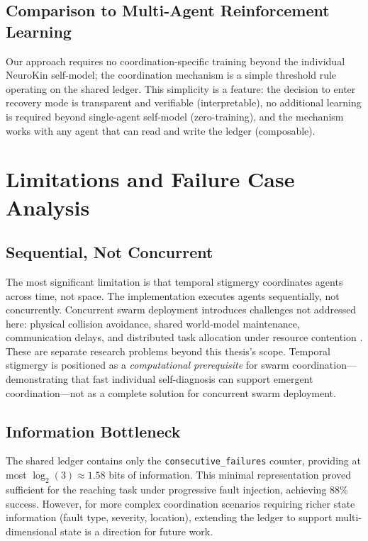 \documentclass[12pt,a4paper,oneside]{report}
\begin{document}
\subsection{Comparison to Multi-Agent Reinforcement Learning}

Our approach requires no coordination-specific training beyond the individual NeuroKin self-model; the coordination mechanism is a simple threshold rule operating on the shared ledger. This simplicity is a feature: the decision to enter recovery mode is transparent and verifiable (interpretable), no additional learning is required beyond single-agent self-model (zero-training), and the mechanism works with any agent that can read and write the ledger (composable).

\section{Limitations and Failure Case Analysis}

\subsection{Sequential, Not Concurrent}

The most significant limitation is that temporal stigmergy coordinates agents across time, not space. The implementation executes agents sequentially, not concurrently. Concurrent swarm deployment introduces challenges not addressed here: physical collision avoidance, shared world-model maintenance, communication delays, and distributed task allocation under resource contention \cite{matsuki2024gaussian, keetha2024splattam}. These are separate research problems beyond this thesis's scope. Temporal stigmergy is positioned as a \textit{computational prerequisite} for swarm coordination---demonstrating that fast individual self-diagnosis can support emergent coordination---not as a complete solution for concurrent swarm deployment.

\subsection{Information Bottleneck}

The shared ledger contains only the \texttt{consecutive\_failures} counter, providing at most $\log_2(3) \approx 1.58$ bits of information. This minimal representation proved sufficient for the reaching task under progressive fault injection, achieving 88\% success. However, for more complex coordination scenarios requiring richer state information (fault type, severity, location), extending the ledger to support multi-dimensional state is a direction for future work.
\end{document}

